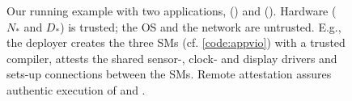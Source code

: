 \begin{figure}
  \centering
  \resizebox{0.80\linewidth}{!}{}
  \caption[Hardware and software components of our running example]{%
    Our running example with two applications, \appavl{} () and
\appvio{} (). Hardware ($N_{*}$ and $D_{*}$) is trusted; the OS and
the network are untrusted. E.g., the \appvio{} deployer creates the three
 \acp{SM} (cf. \cref{code:appvio}) with a trusted compiler, attests
the shared sensor-, clock- and display drivers and sets-up connections between
the \acp{SM}. Remote attestation assures authentic execution of \appavl{} and
\appvio{}. } %
  \label{fig_model}
\end{figure}

